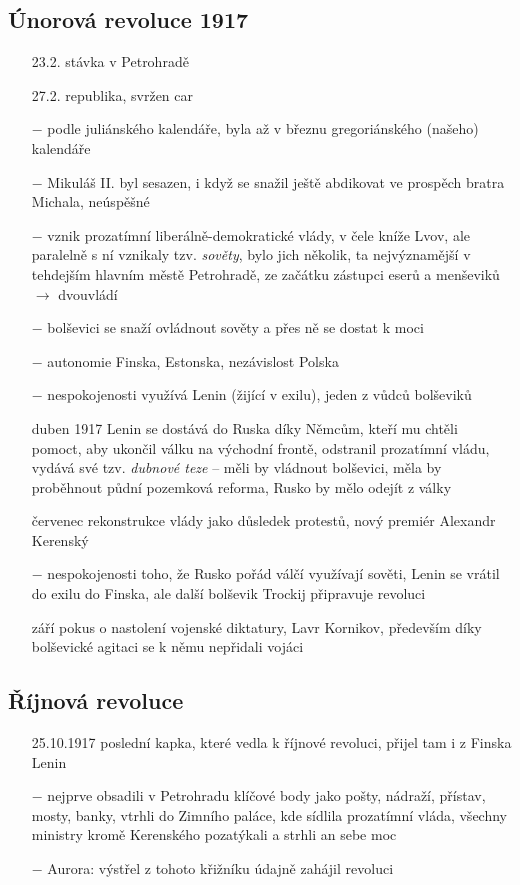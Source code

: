 \documentclass{article}
\begin{document}
\subsection*{Únorová revoluce 1917}
\begin{itemize}
    \vspace{-0.5em}
    \setlength\itemsep{0.15em}
    \item[23.2.] stávka v Petrohradě
    \item[27.2.] republika, svržen car
    \item[$-$] podle juliánského kalendáře, byla až v březnu gregoriánského (našeho) kalendáře
    \item[$-$] Mikuláš II. byl sesazen, i když se snažil ještě abdikovat ve prospěch bratra Michala, neúspěšné
    \item[$-$] vznik prozatímní liberálně-demokratické vlády, v čele kníže Lvov, ale paralelně s ní vznikaly tzv. \textit{sověty}, bylo jich několik, ta nejvýznamější v tehdejším hlavním městě Petrohradě, ze začátku zástupci eserů a menševiků $\rightarrow$ dvouvládí
    \item[$-$] bolševici se snaží ovládnout sověty a přes ně se dostat k moci
    \item[$-$] autonomie Finska, Estonska, nezávislost Polska
    \item[$-$] nespokojenosti využívá Lenin (žijící v exilu), jeden z vůdců bolševiků
    \item[duben 1917] Lenin se dostává do Ruska díky Němcům, kteří mu chtěli pomoct, aby ukončil válku na východní frontě, odstranil prozatímní vládu, vydává své tzv. \textit{dubnové teze} -- měli by vládnout bolševici, měla by proběhnout půdní pozemková reforma, Rusko by mělo odejít z války
    \item[červenec] rekonstrukce vlády jako důsledek protestů, nový premiér Alexandr Kerenský
    \item[$-$] nespokojenosti toho, že Rusko pořád válčí využívají sověti, Lenin se vrátil do exilu do Finska, ale další bolševik Trockij připravuje revoluci
    \item[září] pokus o nastolení vojenské diktatury, Lavr Kornikov, především díky bolševické agitaci se k němu nepřidali vojáci
\end{itemize}

\subsection*{Říjnová revoluce}
\begin{itemize}
    \vspace{-0.5em}
    \setlength\itemsep{0.15em}
    \item[25.10.1917] poslední kapka, které vedla k říjnové revoluci, přijel tam i z Finska Lenin
    \item[$-$] nejprve obsadili v Petrohradu klíčové body jako pošty, nádraží, přístav, mosty, banky, vtrhli do Zimního paláce, kde sídlila prozatímní vláda, všechny ministry kromě Kerenského pozatýkali a strhli an sebe moc
    \item[$-$] Aurora: výstřel z tohoto křižníku údajně zahájil revoluci
\end{itemize}
\end{document}
